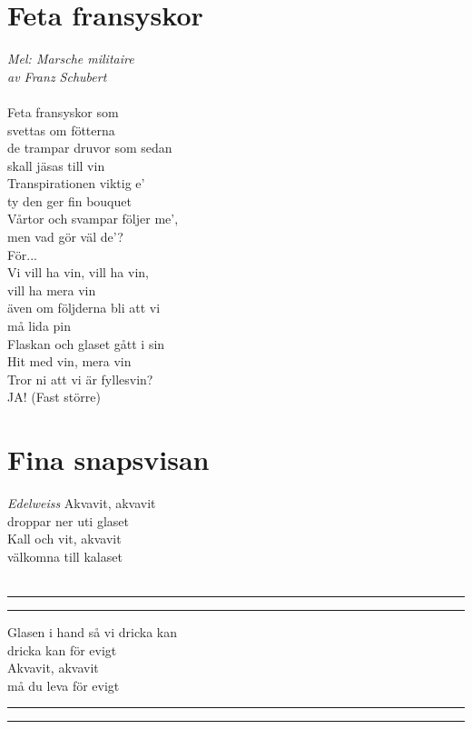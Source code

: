 \documentclass[a5paper,15pt]{article}
\def\repeat{%
  \stackanchor{.}{.}%
  \rule[-\dp\strutbox]{.3pt}{\normalbaselineskip}%
  \kern0.5pt%
  \rule[-\dp\strutbox]{1pt}{\normalbaselineskip}%
  \kern1pt%
}
\def\frepeat{%
  \kern1pt%
  \rule[-\dp\strutbox]{1pt}{\normalbaselineskip}%
  \kern0.5pt%
  \rule[-\dp\strutbox]{.3pt}{\normalbaselineskip}%
  \stackanchor{.}{.}%
}
\begin{document}
\section{Feta fransyskor}
\emph{Mel: Marsche militaire \\av Franz Schubert}
\\
\\
Feta fransyskor som \\svettas om fötterna\\
de trampar druvor som sedan \\skall jäsas till vin\\
Transpirationen viktig e’\\
ty den ger fin bouquet\\
Vårtor och svampar följer me’,\\
men vad gör väl de’?\\
För...\\
Vi vill ha vin, vill ha vin, \\vill ha mera vin\\
även om följderna bli att vi \\må lida pin\\
Flaskan och glaset gått i sin\\
Hit med vin, mera vin\\
Tror ni att vi är fyllesvin?\\
JA! (Fast större)
\\
\section{Fina snapsvisan}
\emph{Edelweiss}
Akvavit, akvavit\\
droppar ner uti glaset\\
Kall och vit, akvavit\\
välkomna till kalaset\\
\\
\frepeat{} Glasen i hand så vi dricka kan\\
dricka kan för evigt\\
Akvavit, akvavit\\
må du leva för evigt \repeat{}
\\
\end{document}
